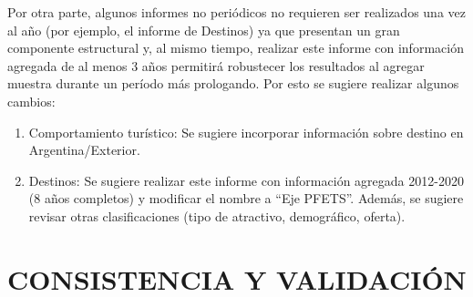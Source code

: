\documentclass[
  openany]{book}
\begin{document}
Por otra parte, algunos informes no periódicos no requieren ser realizados una vez al año (por ejemplo, el informe de Destinos) ya que presentan un gran componente estructural y, al mismo tiempo, realizar este informe con información agregada de al menos 3 años permitirá robustecer los resultados al agregar muestra durante un período más prologando.
Por esto se sugiere realizar algunos cambios:

\begin{enumerate}
\def\labelenumi{\arabic{enumi}.}
\item
  Comportamiento turístico: Se sugiere incorporar información sobre destino en Argentina/Exterior.
\item
  Destinos: Se sugiere realizar este informe con información agregada 2012-2020 (8 años completos) y modificar el nombre a ``Eje PFETS''.
  Además, se sugiere revisar otras clasificaciones (tipo de atractivo, demográfico, oferta).
\end{enumerate}

\hypertarget{consistencia-y-validaciuxf3n}{%
\section{\texorpdfstring{\textbf{CONSISTENCIA Y VALIDACIÓN}}{CONSISTENCIA Y VALIDACIÓN}}\label{consistencia-y-validaciuxf3n}}
\end{document}
